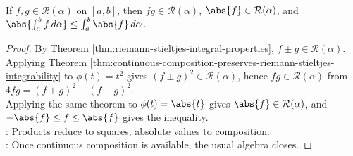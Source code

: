 \begin{theorem} \label{thm:products-and-absolute-values-riemann-stieltjes} \\
If $f,g\in\mathcal{R}(\alpha)$ on $[a,b]$, then $fg\in\mathcal{R}(\alpha)$, $\abs{f}\in\mathcal{R}(\alpha)$, and $\abs{\int_a^b f\,d\alpha}\leq\int_a^b\abs{f}\,d\alpha$.
\begin{proof}
By Theorem \ref{thm:riemann-stieltjes-integral-properties}, $f\pm g\in\mathcal{R}(\alpha)$. Applying Theorem \ref{thm:continuous-composition-preserves-riemann-stieltjes-integrability} to $\phi(t)=t^2$ gives $(f\pm g)^2\in\mathcal{R}(\alpha)$, hence $fg\in\mathcal{R}(\alpha)$ from $4fg=(f+g)^2-(f-g)^2$.\\
Applying the same theorem to $\phi(t)=\abs{t}$ gives $\abs{f}\in\mathcal{R}(\alpha)$, and $-\abs{f}\leq f\leq\abs{f}$ gives the inequality.\\
: Products reduce to squares; absolute values to composition.\\
: Once continuous composition is available, the usual algebra closes.
\end{proof}
\end{theorem}

